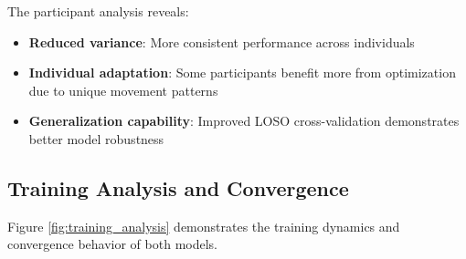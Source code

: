 \documentclass[a4paper,11pt]{article}
\begin{document}
The participant analysis reveals:
\begin{itemize}
\item \textcolor{improvement}{\textbf{Reduced variance}}: More consistent performance across individuals
\item \textbf{Individual adaptation}: Some participants benefit more from optimization due to unique movement patterns
\item \textbf{Generalization capability}: Improved LOSO cross-validation demonstrates better model robustness
\end{itemize}

\subsection{Training Analysis and Convergence}

Figure \ref{fig:training_analysis} demonstrates the training dynamics and convergence behavior of both models.
\end{document}
